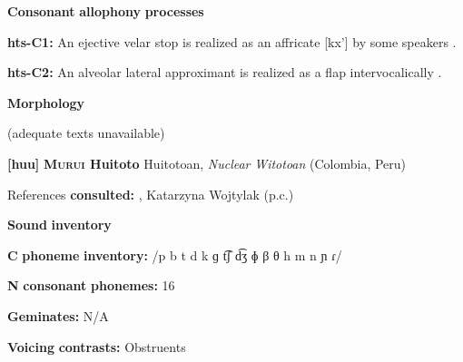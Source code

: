 \begin{styleBody}
\textbf{Consonant} \textbf{allophony} \textbf{processes}
\end{styleBody}

\begin{styleBody}
\textbf{hts-C1:} An ejective velar stop is realized as an affricate [kx’] by some speakers \citep[41]{Sands2013}.
\end{styleBody}

\begin{styleBody}
\textbf{hts-C2:} An alveolar lateral approximant is realized as a flap intervocalically \citep[41]{Sands2013}.
\end{styleBody}

\begin{styleBody}
\textbf{Morphology}
\end{styleBody}

\begin{styleBody}
(adequate texts unavailable)
\end{styleBody}

\begin{styleBody}
\textbf{[huu]}   \textbf{\textsc{Murui} \textbf{Huitoto}  }  Huitotoan, \textit{Nuclear} \textit{Witotoan} (Colombia, Peru)
\end{styleBody}

\begin{styleBody}
References \textbf{consulted:} \citet{Wojtylak2017}, Katarzyna Wojtylak (p.c.)
\end{styleBody}

\begin{styleBody}
\textbf{Sound} \textbf{inventory}
\end{styleBody}

\begin{styleBody}
\textbf{C} \textbf{phoneme} \textbf{inventory:} /p b t d k ɡ t͡ʃ d͡ʒ ɸ β θ h m n ɲ ɾ/
\end{styleBody}

\begin{styleBody}
\textbf{N} \textbf{consonant} \textbf{phonemes:} 16
\end{styleBody}

\begin{styleBody}
\textbf{Geminates:} N/A
\end{styleBody}

\begin{styleBody}
\textbf{Voicing} \textbf{contrasts:} Obstruents
\end{styleBody}

